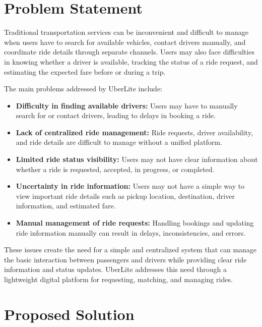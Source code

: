 \documentclass[11pt,a4paper]{article}
\begin{document}
\section{Problem Statement}

Traditional transportation services can be inconvenient and difficult
to manage when users have to search for available vehicles, contact
drivers manually, and coordinate ride details through separate
channels. Users may also face difficulties in knowing whether a
driver is available, tracking the status of a ride request, and
estimating the expected fare before or during a trip.

The main problems addressed by UberLite include:

\begin{itemize}

    \item \textbf{Difficulty in finding available drivers:} Users may
    have to manually search for or contact drivers, leading to delays
    in booking a ride.

    \item \textbf{Lack of centralized ride management:} Ride
    requests, driver availability, and ride details are difficult to
    manage without a unified platform.

    \item \textbf{Limited ride status visibility:} Users may not have
    clear information about whether a ride is requested, accepted,
    in progress, or completed.

    \item \textbf{Uncertainty in ride information:} Users may not have
    a simple way to view important ride details such as pickup
    location, destination, driver information, and estimated fare.

    \item \textbf{Manual management of ride requests:} Handling
    bookings and updating ride information manually can result in
    delays, inconsistencies, and errors.

\end{itemize}

These issues create the need for a simple and centralized system that
can manage the basic interaction between passengers and drivers while
providing clear ride information and status updates. UberLite
addresses this need through a lightweight digital platform for
requesting, matching, and managing rides.


\section{Proposed Solution}
\end{document}
